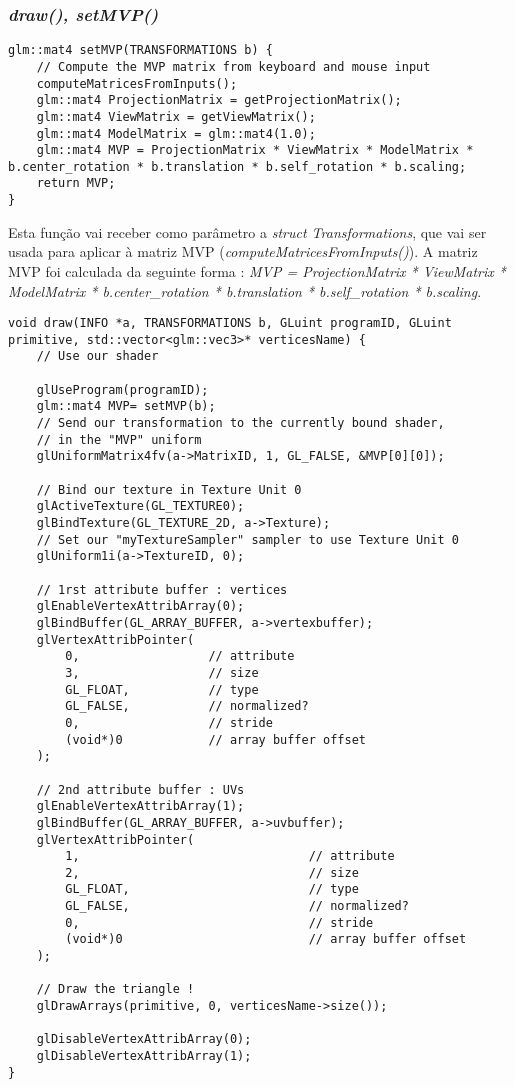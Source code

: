 \subsubsection{\textit{draw(), setMVP()}}
\begin{lstlisting}[caption=\textit{setMVP()}.]
glm::mat4 setMVP(TRANSFORMATIONS b) {
	// Compute the MVP matrix from keyboard and mouse input
	computeMatricesFromInputs();
	glm::mat4 ProjectionMatrix = getProjectionMatrix();
	glm::mat4 ViewMatrix = getViewMatrix();
	glm::mat4 ModelMatrix = glm::mat4(1.0);
	glm::mat4 MVP = ProjectionMatrix * ViewMatrix * ModelMatrix * b.center_rotation * b.translation * b.self_rotation * b.scaling;
	return MVP;
}
\end{lstlisting}
Esta função vai receber como parâmetro a \textit{struct Transformations}, que vai ser usada para aplicar à matriz MVP (\textit{computeMatricesFromInputs()}). A matriz MVP foi calculada da seguinte forma : \textit{MVP = ProjectionMatrix * ViewMatrix * ModelMatrix * b.center\_rotation * b.translation * b.self\_rotation * b.scaling}.

\begin{lstlisting}[caption=\textit{draw()}.]
void draw(INFO *a, TRANSFORMATIONS b, GLuint programID, GLuint primitive, std::vector<glm::vec3>* verticesName) {
	// Use our shader
	
	glUseProgram(programID);
	glm::mat4 MVP= setMVP(b);
	// Send our transformation to the currently bound shader, 
	// in the "MVP" uniform
	glUniformMatrix4fv(a->MatrixID, 1, GL_FALSE, &MVP[0][0]);

	// Bind our texture in Texture Unit 0
	glActiveTexture(GL_TEXTURE0);
	glBindTexture(GL_TEXTURE_2D, a->Texture);
	// Set our "myTextureSampler" sampler to use Texture Unit 0
	glUniform1i(a->TextureID, 0);

	// 1rst attribute buffer : vertices
	glEnableVertexAttribArray(0);
	glBindBuffer(GL_ARRAY_BUFFER, a->vertexbuffer);
	glVertexAttribPointer(
		0,                  // attribute
		3,                  // size
		GL_FLOAT,           // type
		GL_FALSE,           // normalized?
		0,                  // stride
		(void*)0            // array buffer offset
	);

	// 2nd attribute buffer : UVs
	glEnableVertexAttribArray(1);
	glBindBuffer(GL_ARRAY_BUFFER, a->uvbuffer);
	glVertexAttribPointer(
		1,                                // attribute
		2,                                // size
		GL_FLOAT,                         // type
		GL_FALSE,                         // normalized?
		0,                                // stride
		(void*)0                          // array buffer offset
	);

	// Draw the triangle !
	glDrawArrays(primitive, 0, verticesName->size());

	glDisableVertexAttribArray(0);
	glDisableVertexAttribArray(1);
}
\end{lstlisting}

